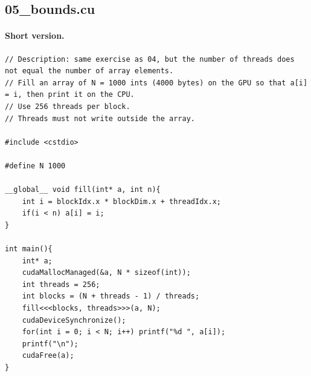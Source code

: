 \documentclass[main.tex]{subfiles}
\begin{document}
\subsection{05\_bounds.cu}
\paragraph{Short version.}
\begin{lstlisting}[language=CUDA]
// Description: same exercise as 04, but the number of threads does not equal the number of array elements.
// Fill an array of N = 1000 ints (4000 bytes) on the GPU so that a[i] = i, then print it on the CPU.
// Use 256 threads per block.
// Threads must not write outside the array.

#include <cstdio>

#define N 1000

__global__ void fill(int* a, int n){
    int i = blockIdx.x * blockDim.x + threadIdx.x;
    if(i < n) a[i] = i;
}

int main(){
    int* a;
    cudaMallocManaged(&a, N * sizeof(int));
    int threads = 256;
    int blocks = (N + threads - 1) / threads;
    fill<<<blocks, threads>>>(a, N);
    cudaDeviceSynchronize();
    for(int i = 0; i < N; i++) printf("%d ", a[i]);
    printf("\n");
    cudaFree(a);
}
\end{lstlisting}
\end{document}

